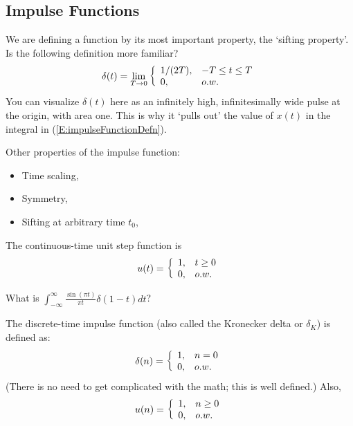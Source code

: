 

\subsection{Impulse Functions}


We are defining a function by its most important property, the
`sifting property'.  Is the following definition more
familiar?
\[
  \delta(t) = \lim_{T\rightarrow 0} { \left\{\begin{array}{ll} {1/(2T)}, & {-T \le t \le T} \\ 0, & o.w. \end{array}\right. }
\]
You can visualize $\delta(t)$ here as an infinitely high,
infinitesimally wide pulse at the origin, with area one.  This is
why it `pulls out' the value of $x(t)$ in the integral in
(\ref{E:impulseFunctionDefn}).

Other properties of the impulse function:
\begin{itemize}
  \item Time scaling,
  \item Symmetry,
  \item Sifting at arbitrary time $t_0$,
\end{itemize}

The continuous-time unit step function is
\[
 u(t) = { \left\{\begin{array}{ll} {1}, & {t\ge 0} \\ 0, & o.w. \end{array}\right. }
\]


 What is $\int_{-\infty}^\infty \frac{\sin
(\pi t)}{\pi t} \delta(1-t) dt$?


The discrete-time impulse function (also called the Kronecker delta
or $\delta_K$) is defined as:
\[
 \delta(n) = { \left\{\begin{array}{ll} {1}, & {n=0} \\ 0, & o.w. \end{array}\right. }
\]
(There is no need to get complicated with the math; this is well
defined.)  Also,
\[
 u(n) = { \left\{\begin{array}{ll} {1}, & {n\ge 0} \\ 0, & o.w. \end{array}\right. }
\]





